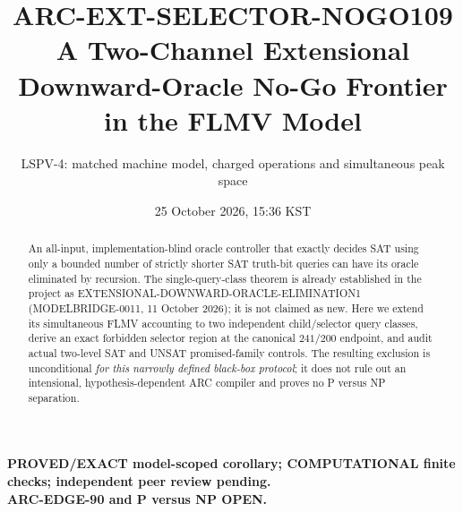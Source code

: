 \documentclass[11pt]{article}
\title{ARC-EXT-SELECTOR-NOGO109\\\large A Two-Channel Extensional Downward-Oracle No-Go Frontier in the FLMV Model}
\author{LSPV-4: matched machine model, charged operations and simultaneous peak space}
\date{25 October 2026, 15:36 KST}
\begin{document}
\maketitle
\begin{center}
\textbf{PROVED/EXACT model-scoped corollary; COMPUTATIONAL finite checks; independent peer review pending.}\\
\textbf{ARC-EDGE-90 and P versus NP OPEN.}
\end{center}
\begin{abstract}
An all-input, implementation-blind oracle controller that exactly decides SAT using only a bounded number of strictly shorter SAT truth-bit queries can have its oracle eliminated by recursion. The single-query-class theorem is already established in the project as EXTENSIONAL-DOWNWARD-ORACLE-ELIMINATION1 (MODELBRIDGE-0011, 11 October 2026); it is not claimed as new. Here we extend its simultaneous FLMV accounting to two independent child/selector query classes, derive an exact forbidden selector region at the canonical $241/200$ endpoint, and audit actual two-level SAT and UNSAT promised-family controls. The resulting exclusion is unconditional \emph{for this narrowly defined black-box protocol}; it does not rule out an intensional, hypothesis-dependent ARC compiler and proves no P versus NP separation.
\end{abstract}
\end{document}
